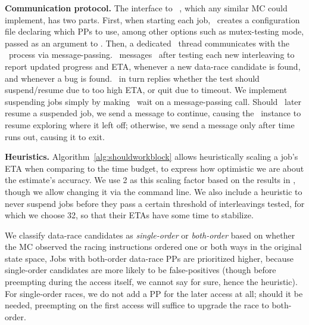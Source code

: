 {\bf Communication protocol.}
The interface to \landslide~, which any similar MC could implement, has two parts.
First, when starting each job, \quicksand~creates a configuration file declaring which PPs to use,
among other options such as mutex-testing mode,
passed as an argument to \landslide.
Then, a dedicated \quicksand~thread communicates with the \landslide~process via message-passing. %
\landslide~messages \quicksand~after testing each new interleaving to report updated progress and ETA,
whenever a new data-race candidate is found, and whenever a bug is found.
\quicksand~in turn replies whether the test should suspend/resume due to too high ETA, or quit due to timeout.
We implement suspending jobs simply by making \landslide~wait on a message-passing call.
Should \quicksand~later resume a suspended job, we send a message to continue,
causing the \landslide~instance to resume exploring where it left off;
otherwise, we send a message only after time runs out, causing it to exit.

{\bf Heuristics.}
Algorithm~\ref{alg:shouldworkblock} allows heuristically scaling a job's ETA when comparing to the time budget,
to express how optimistic we are about the estimate's accuracy.
We use 2 as this scaling factor based on the results in \cite{estimation},
though we allow changing it via the command line.
We also include a heuristic to
never suspend jobs before they pass a certain threshold of interleavings tested,
for which we choose 32,
so that their ETAs have some time to stabilize.

We classify data-race candidates as {\em single-order} or {\em both-order} \cite{portend}
based on whether the MC observed the racing instructions ordered one or both ways in the original state space,
Jobs with both-order data-race PPs are prioritized higher,
because single-order candidates are more likely to be false-positives
(though before preempting during the access itself, we cannot say for sure, hence the heuristic).
For single-order races, we do not add a PP for the later access at all;
should it be needed, preempting on the first access will suffice to upgrade the race to both-order.

